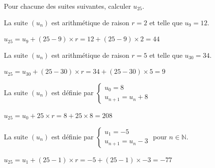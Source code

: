 \documentclass[12pt,a4paper]{article}  %
\begin{document}
Pour chacune des suites suivantes, calculer $u_{25}$.
\begin{enumMet}
    \item La suite $\left(u_{n}\right)$ est arithmétique de raison $r=2$ et telle que $u_{9}=12$.\\
    \begin{corrBox}
        $u_{25}=u_{9}+(25-9)\times r=12+(25-9)\times 2=44$
    \end{corrBox}
    \item La suite $\left(u_{n}\right)$ est arithmétique de raison $r=5$ et telle que $u_{30}=34$.\\
    \begin{corrBox}
        $u_{25}=u_{30}+(25-30)\times r=34+(25-30)\times 5=9$
    \end{corrBox}
    \item La suite $\left(u_{n}\right)$ est définie par $\left\{\begin{array}{l}u_{0}=8 \\ u_{n+1}=u_{n}+8\end{array}\right.$\\
    \begin{corrBox}
        $u_{25}=u_{0}+25\times r=8+25\times 8=208$
    \end{corrBox}
    \item {} La suite $\left(u_{n}\right)$ est définie par $\left\{\begin{array}{l}u_{1}=-5 \\ u_{n+1}=u_{n}-3\end{array}\right.$ pour $n \in \mathbb{N}$.\\
    \begin{corrBox}
        $u_{25}=u_{1}+(25-1)\times r=-5+(25-1)\times -3=-77$
    \end{corrBox}
\end{enumMet}
\end{document}
